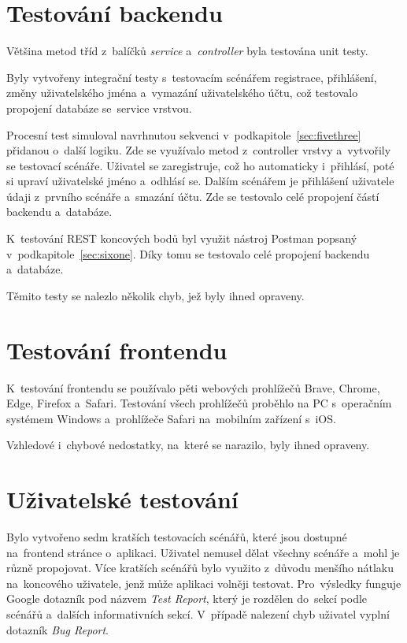 \documentclass[twoside]{ctuthesis}
\begin{document}
\section{Testování backendu}

Většina metod tříd z~balíčků \emph{service} a~\emph{controller} byla testována unit testy. 

Byly vytvořeny integrační testy s~testovacím scénářem registrace, přihlášení, změny uživatelského jména a~vymazání uživatelského účtu, což testovalo propojení databáze se~service vrstvou.

Procesní test simuloval navrhnutou sekvenci v~podkapitole~\ref{sec:fivethree} přidanou o~další logiku. Zde se využívalo metod z~controller vrstvy a~vytvořily se testovací scénáře. Uživatel se zaregistruje, což ho automaticky i~přihlásí, poté si upraví uživatelské jméno a~odhlásí se. Dalším scénářem je přihlášení uživatele údaji z~prvního scénáře a~smazání účtu. Zde se testovalo celé propojení částí backendu a~databáze.

K~testování REST koncových bodů byl využit nástroj Postman popsaný v~podkapitole~\ref{sec:sixone}. Díky tomu se testovalo celé propojení backendu a~databáze.

Těmito testy se nalezlo několik chyb, jež byly ihned opraveny.

\section{Testování frontendu}

K~testování frontendu se používalo pěti webových prohlížečů Brave, Chrome, Edge, Firefox a~Safari. Testování všech prohlížečů proběhlo na PC s~operačním systémem Windows a~prohlížeče Safari na~mobilním zařízení s~iOS.

Vzhledové i~chybové nedostatky, na~které se narazilo, byly ihned opraveny.

\newpage

\section{Uživatelské testování}

Bylo vytvořeno sedm kratších testovacích scénářů, které jsou dostupné na~frontend stránce o~aplikaci. Uživatel nemusel dělat všechny scénáře a~mohl je různě propojovat. Více kratších scénářů bylo využito z~důvodu menšího nátlaku na~koncového uživatele, jenž může aplikaci volněji testovat. Pro~výsledky funguje Google dotazník pod názvem \emph{Test Report}, který je rozdělen do~sekcí podle scénářů a~dalších informativních sekcí. V~případě nalezení chyb uživatel vyplní dotazník \emph{Bug Report}.
\end{document}
